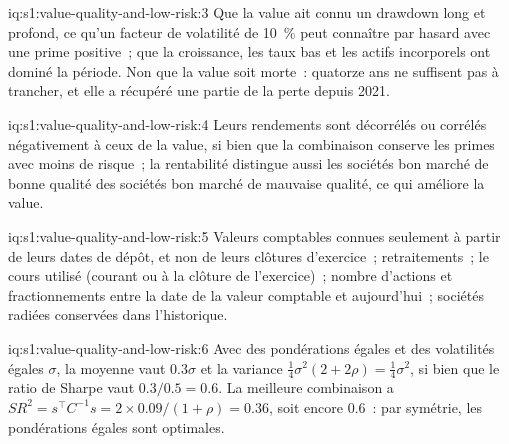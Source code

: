 \begin{solution}{iq:s1:value-quality-and-low-risk:3}
Que la value ait connu un drawdown long et profond, ce qu'un facteur de volatilité de 10~\% peut connaître par hasard avec une prime positive~; que la croissance, les taux bas et les actifs incorporels
ont dominé la période. Non que la value soit morte~: quatorze ans ne suffisent pas à trancher, et elle a récupéré une partie de la perte depuis 2021.
\end{solution}

\begin{solution}{iq:s1:value-quality-and-low-risk:4}
Leurs rendements sont décorrélés ou corrélés négativement à ceux de la value, si bien que la combinaison conserve les primes avec moins de risque~; la rentabilité distingue aussi
les sociétés bon marché de bonne qualité des sociétés bon marché de mauvaise qualité, ce qui améliore la value.
\end{solution}

\begin{solution}{iq:s1:value-quality-and-low-risk:5}
Valeurs comptables connues seulement à partir de leurs dates de dépôt, et non de leurs clôtures d'exercice~; retraitements~; le cours utilisé (courant ou à la clôture de l'exercice)~; nombre d'actions et fractionnements
entre la date de la valeur comptable et aujourd'hui~; sociétés radiées conservées dans l'historique.
\end{solution}

\begin{solution}{iq:s1:value-quality-and-low-risk:6}
Avec des pondérations égales et des volatilités égales $\sigma$, la moyenne vaut $0.3\sigma$ et la variance $\frac14\sigma^2(2 + 2\rho) = \frac14\sigma^2$, si bien que le ratio de Sharpe
vaut $0.3/0.5 = 0.6$. La meilleure combinaison a $SR^2 = s^\top C^{-1} s = 2 \times 0.09/(1 + \rho) = 0.36$, soit encore 0.6~: par symétrie, les pondérations égales sont
optimales.
\end{solution}

